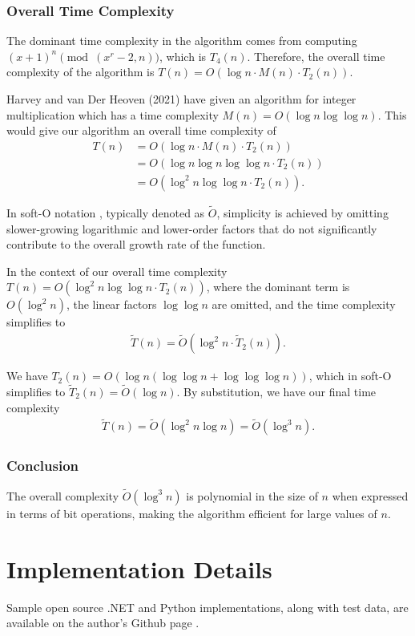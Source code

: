 \documentclass{article}
\theoremstyle{plain}
\theoremstyle{definition}
\begin{document}
\subsubsection{Overall Time Complexity}
The dominant time complexity in the algorithm comes from computing $(x+1)^n \pmod{(x^r-2,n)}$, which is $T_4(n)$. Therefore, the overall time complexity of the algorithm is $T(n) = O(\log n \cdot M(n) \cdot T_2(n))$.

Harvey and van Der Heoven (2021) \cite{harveyvanderhoeven2021} have given an algorithm for integer multiplication which has a time complexity $M(n) = O(\log n \log\log n)$. This would give our algorithm an overall time complexity of
\begin{align*}
    T(n) &= O(\log n \cdot  M(n) \cdot  T_2(n))
    \\ &= O(\log n \log n \log\log n \cdot  T_2(n))
    \\ &= O(\log^2 n \log\log n \cdot  T_2(n)) .
\end{align*}

In soft-O notation \cite{gathengerhard2013softo}, typically denoted as $\tilde{O}$, simplicity is achieved by omitting slower-growing logarithmic and lower-order factors that do not significantly contribute to the overall growth rate of the function.

In the context of our overall time complexity $T(n) = O(\log^2 n \log\log n \cdot T_2(n))$, where the dominant term is $O(\log^2 n)$, the linear factors $\log\log n$ are omitted, and the time complexity simplifies to
\begin{align*}
    \tilde{T}(n) = \tilde{O}(\log^2 n \cdot \tilde{T}_2(n)) .
\end{align*}

We have $T_2(n) = O(\log n (\log \log n + \log \log \log n))$, which in soft-O simplifies to $\tilde{T}_2(n) = \tilde{O}(\log n)$. By substitution, we have our final time complexity
\begin{align*}
    \tilde{T}(n) = \tilde{O}(\log^2 n \log n) = \tilde{O}(\log^3 n) .
\end{align*}

\subsubsection{Conclusion}
The overall complexity $\tilde{O}(\log^3 n)$ is polynomial in the size of $n$ when expressed in terms of bit operations, making the algorithm efficient for large values of $n$.

\section{Implementation Details}
Sample open source .NET and Python implementations, along with test data, are available on the author's Github page \cite{githubrepo}.
\end{document}
